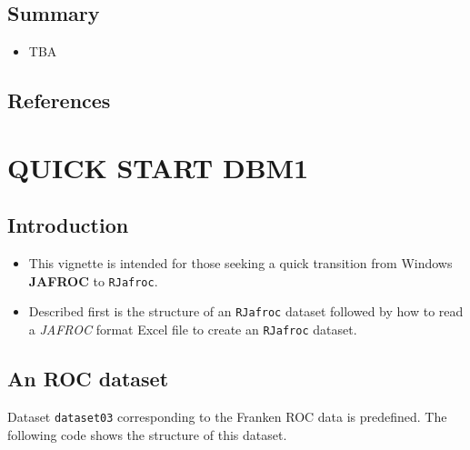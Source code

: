 \documentclass[
]{book}
\providecommand{\tightlist}{%
  \setlength{\itemsep}{0pt}\setlength{\parskip}{0pt}}
\begin{document}
\hypertarget{summary-2}{%
\section{Summary}\label{summary-2}}

\begin{itemize}
\tightlist
\item
  TBA
\end{itemize}

\hypertarget{references-4}{%
\section{References}\label{references-4}}

\hypertarget{QuickStartDBM1}{%
\chapter{QUICK START DBM1}\label{QuickStartDBM1}}

\hypertarget{introduction-4}{%
\section{Introduction}\label{introduction-4}}

\begin{itemize}
\tightlist
\item
  This vignette is intended for those seeking a quick transition from Windows \textbf{JAFROC} to \texttt{RJafroc}.
\item
  Described first is the structure of an \texttt{RJafroc} dataset followed by how to read
  a \emph{JAFROC} format Excel file to create an \texttt{RJafroc} dataset.
\end{itemize}

\hypertarget{an-roc-dataset}{%
\section{An ROC dataset}\label{an-roc-dataset}}

Dataset \texttt{dataset03} corresponding to the Franken ROC data \citep{RN1995} is predefined. The following code shows the structure of this dataset.
\end{document}
